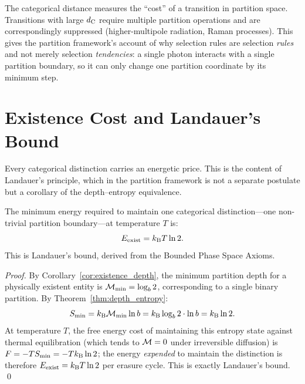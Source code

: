 The categorical distance measures the ``cost'' of a transition in partition
space. Transitions with large $d_{\mathrm{C}}$ require multiple partition operations and
are correspondingly suppressed (higher-multipole radiation, Raman processes).
This gives the partition framework's account of why selection rules are selection
\emph{rules} and not merely selection \emph{tendencies}: a single photon
interacts with a single partition boundary, so it can only change one
partition coordinate by its minimum step.

\section{Existence Cost and Landauer's Bound}
\label{sec:existence_cost}

Every categorical distinction carries an energetic price. This is the content
of Landauer's principle, which in the partition framework is not a separate
postulate but a corollary of the depth--entropy equivalence.

\begin{theorem}
\label{thm:existence_cost}
The minimum energy required to maintain one categorical distinction---one
non-trivial partition boundary---at temperature $T$ is:
\begin{equation}
  E_{\mathrm{exist}} = k_{\mathrm{B}} T \ln 2.
  \label{eq:existence_cost}
\end{equation}
This is Landauer's bound, derived from the Bounded Phase Space Axioms.
\end{theorem}

\begin{proof}
By Corollary~\ref{cor:existence_depth}, the minimum partition depth for a
physically existent entity is $\mathcal{M}_{\min} = \log_b 2$, corresponding to
a single binary partition. By Theorem~\ref{thm:depth_entropy}:
\begin{equation}
  S_{\min} = k_{\mathrm{B}} \mathcal{M}_{\min} \ln b = k_{\mathrm{B}} \log_b 2 \cdot \ln b = k_{\mathrm{B}} \ln 2.
\end{equation}
At temperature $T$, the free energy cost of maintaining this entropy state
against thermal equilibration (which tends to $\mathcal{M} = 0$ under irreversible
diffusion) is $F = -TS_{\min} = -T k_{\mathrm{B}} \ln 2$; the energy \emph{expended}
to maintain the distinction is therefore $E_{\mathrm{exist}} = k_{\mathrm{B}} T \ln 2$ per erasure
cycle. This is exactly Landauer's bound. \qed
\end{proof}

